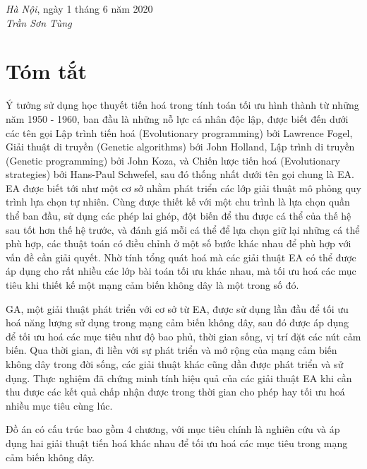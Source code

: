 \documentclass{hust}
\begin{document}
\begin{flushright}
	\begin{minipage}[t]{0.5\textwidth}
		\begin{center}
			\textit{Hà Nội}, ngày 1 tháng 6 năm 2020\\
			
			\textit{Trần Sơn Tùng}
		\end{center}
	\end{minipage}
\end{flushright}

\pagebreak

\chapter*{Tóm tắt}
Ý tưởng sử dụng học thuyết tiến hoá trong tính toán tối ưu hình thành từ những năm 1950 - 1960, ban đầu là những nỗ lực cá nhân độc lập, được biết đến dưới các tên gọi Lập trình tiến hoá (Evolutionary programming) bởi Lawrence Fogel, Giải thuật di truyền (Genetic algorithms) bới John Holland, Lập trình di truyền (Genetic programming) bởi John Koza, và Chiến lược tiến hoá (Evolutionary strategies) bởi Hans-Paul Schwefel, sau đó thống nhất dưới tên gọi chung là \Gls{EA}. \Gls{EA} được biết tới như một cơ sở nhằm phát triển các lớp giải thuật mô phỏng quy trình lựa chọn tự nhiên. Cùng được thiết kế với một chu trình là lựa chọn quần thể ban đầu, sử dụng các phép lai ghép, đột biến để thu được cá thể của thế hệ sau tốt hơn thế hệ trước, và đánh giá mỗi cá thể để lựa chọn giữ lại những cá thể phù hợp, các thuật toán có điều chỉnh ở một số bước khác nhau để phù hợp với vấn đề cần giải quyết. Nhờ tính tổng quát hoá mà các giải thuật \gls{EA} có thể được áp dụng cho rất nhiều các lớp bài toán tối ưu khác nhau, mà tối ưu hoá các mục tiêu khi thiết kế một mạng cảm biến không dây là một trong số đó.


\Gls{GA}, một giải thuật phát triển với cơ sở từ \gls{EA}, được sử dụng lần đầu để tối ưu hoá năng lượng sử dụng trong mạng cảm biến không dây, sau đó được áp dụng để tối ưu hoá các mục tiêu như độ bao phủ, thời gian sống, vị trí đặt các nút cảm biến. Qua thời gian, đi liền với sự phát triển và mở rộng của mạng cảm biến không dây trong đời sống, các giải thuật khác cũng dần được phát triển và sử dụng. Thực nghiệm đã chứng minh tính hiệu quả của các giải thuật \gls{EA} khi cần thu được các kết quả chấp nhận được trong thời gian cho phép hay tối ưu hoá nhiều mục tiêu cùng lúc.

\pagebreak
Đồ án có cấu trúc bao gồm 4 chương, với mục tiêu chính là nghiên cứu và áp dụng hai giải thuật tiến hoá khác nhau để tối ưu hoá các mục tiêu trong mạng cảm biến không dây. 
\end{document}
